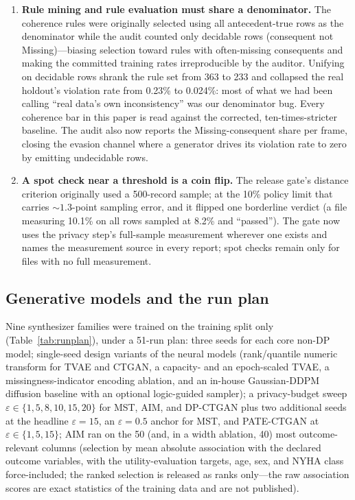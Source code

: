\documentclass[11pt,a4paper]{article}
\newcommand{\eps}{\ensuremath{\varepsilon}}
\begin{document}
\begin{enumerate}
$5.6\times$ to $1.14\times$: the claim survives, honestly. We suspect most
published ``real-vs-real reference'' comparisons carry this bias.
\item \textbf{Rule mining and rule evaluation must share a denominator.} The
coherence rules were originally selected using all antecedent-true rows as the
denominator while the audit counted only decidable rows (consequent not
Missing)---biasing selection toward rules with often-missing consequents and
making the committed training rates irreproducible by the auditor. Unifying on
decidable rows shrank the rule set from 363 to 233 and collapsed the real
holdout's violation rate from 0.23\% to 0.024\%: most of what we had been calling
``real data's own inconsistency'' was our denominator bug. Every coherence bar in
this paper is read against the corrected, ten-times-stricter baseline. The audit
also now reports the Missing-consequent share per frame, closing the evasion
channel where a generator drives its violation rate to zero by emitting
undecidable rows.
\item \textbf{A spot check near a threshold is a coin flip.} The release gate's
distance criterion originally used a 500-record sample; at the 10\% policy limit
that carries ${\sim}1.3$-point sampling error, and it flipped one borderline
verdict (a file measuring 10.1\% on all rows sampled at 8.2\% and ``passed'').
The gate now uses the privacy step's full-sample measurement wherever one exists
and names the measurement source in every report; spot checks remain only for
files with no full measurement.
\end{enumerate}

\subsection{Generative models and the run plan}

Nine synthesizer families were trained on the training split only
(Table~\ref{tab:runplan}), under a 51-run plan: three seeds for each core non-DP
model; single-seed design variants of the neural models (rank/quantile numeric
transform for TVAE and CTGAN, a capacity- and an epoch-scaled TVAE, a
missingness-indicator encoding ablation, and an in-house Gaussian-DDPM diffusion
baseline with an optional logic-guided sampler); a privacy-budget sweep
$\eps \in \{1, 5, 8, 10, 15, 20\}$ for MST, AIM, and DP-CTGAN plus two additional
seeds at the headline $\eps = 15$, an $\eps = 0.5$ anchor for MST, and PATE-CTGAN
at $\eps \in \{1, 5, 15\}$; AIM ran on the 50 (and, in a width ablation, 40) most
outcome-relevant columns (selection by mean absolute association with the declared
outcome variables, with the utility-evaluation targets, age, sex, and NYHA class
force-included; the ranked selection is released as ranks only---the raw
association scores are exact statistics of the training data and are not
published).
\end{document}
